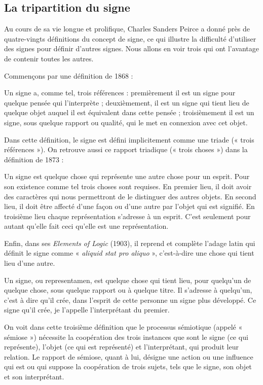 \subsection{La tripartition du signe}
Au cours de sa vie longue et prolifique, Charles Sanders Peirce a donné près de quatre-vingts définitions du concept de signe, ce qui illustre la difficulté d’utiliser des signes pour définir d’autres signes. Nous allons en voir trois qui ont l’avantage de contenir toutes les autres.

Commençons par une définition de 1868 :
\begin{lecture}{}
Un signe a, comme tel, trois références : premièrement il est un signe pour quelque pensée qui l’interprète ; deuxièmement, il est un signe qui tient lieu de quelque objet auquel il est équivalent dans cette pensée ; troisièmement il est un signe, sous quelque rapport ou qualité, qui le met en connexion avec cet objet.
\end{lecture}
Dans cette définition, le signe est défini implicitement comme une triade (« trois références »). On retrouve aussi ce rapport triadique (« trois choses ») dans la définition de 1873 :
\begin{lecture}{}
Un signe est quelque chose qui représente une autre chose pour un esprit. Pour son existence comme tel trois choses sont requises. En premier lieu, il doit avoir des caractères qui nous permettront de le distinguer des autres objets. En second lieu, il doit être affecté d’une façon ou d’une autre par l’objet qui est signifié. En troisième lieu chaque représentation s’adresse à un esprit. C’est seulement pour autant qu’elle fait ceci qu’elle est une représentation.
\end{lecture}
Enfin, dans ses \textit{Elements of Logic} (1903), il reprend et complète l’adage latin qui définit le signe comme « \textit{aliquid stat pro aliquo} », c’est-à-dire une chose qui tient lieu d’une autre.
\begin{lecture}{}
Un signe, ou representamen, est quelque chose qui tient lieu, pour quelqu’un de quelque chose, sous quelque rapport ou à quelque titre. Il s’adresse à quelqu’un, c’est à dire qu’il crée, dans l’esprit de cette personne un signe plus développé. Ce signe qu’il crée, je l’appelle l’interprétant du premier.
\end{lecture}
On voit dans cette troisième définition que le processus sémiotique (appelé « sémiose ») nécessite la coopération des trois instances que sont le signe (ce qui représente), l’objet (ce qui est représenté) et l’interprétant, qui produit leur relation. Le rapport de sémiose, quant à lui, désigne une action ou une influence qui est ou qui suppose la coopération de trois sujets, tels que le signe, son objet et son interprétant.

